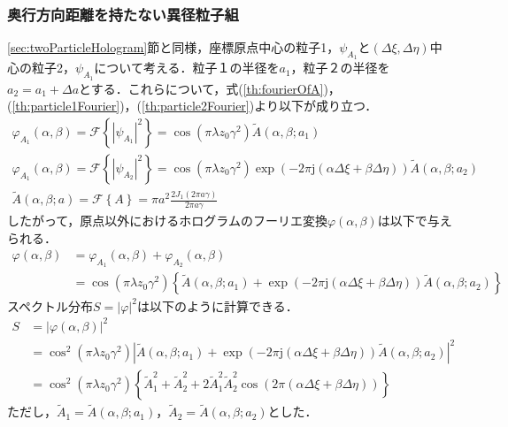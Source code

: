 \subsubsection{奥行方向距離を持たない異径粒子組}
\label{sec:appendix_deviation_radius}
\ref{sec:twoParticleHologram}節と同様，座標原点中心の粒子1，$\psi_{A_1}$と$(\Delta \xi, \Delta \eta)$中心の粒子2，$\psi_{A_1}$について考える．粒子１の半径を$a_1$，粒子２の半径を$a_2 = a_1 + \Delta a$とする．これらについて，式(\ref{th:fourierOfA})，(\ref{th:particle1Fourier})，(\ref{th:particle2Fourier})より以下が成り立つ．
\begin{gather}
    \varphi_{A_1} (\alpha,\beta) = \mathcal{F} \left\{ \left|\psi_{A_1}\right|^2 \right\} = \cos{\left( \pi \lambda z_0 \gamma^2 \right)} \tilde{A}(\alpha,\beta;a_1) \\
    \varphi_{A_1} (\alpha,\beta) = \mathcal{F} \left\{ \left|\psi_{A_2}\right|^2 \right\} = \cos{ \left( \pi \lambda z_0 \gamma^2 \right) } \exp{\left( -2\pi \mathrm{j}\left( \alpha \Delta \xi + \beta \Delta \eta \right) \right)} \tilde{A}(\alpha,\beta;a_2) \\
    \tilde{A}(\alpha,\beta;a) = \mathcal{F}\left\{ A \right\} = \pi a^2 \frac{2J_1(2\pi a \gamma)}{2\pi a \gamma}
\end{gather}
したがって，原点以外におけるホログラムのフーリエ変換$\varphi(\alpha,\beta)$は以下で与えられる．
\begin{align}
    \varphi(\alpha,\beta) &= \varphi_{A_1}(\alpha,\beta) + \varphi_{A_2}(\alpha,\beta) \\
    &= \cos{\left( \pi \lambda z_0 \gamma^2 \right)} \left\{ \tilde{A}(\alpha,\beta;a_1) + \exp{\left( -2\pi \mathrm{j}\left( \alpha \Delta \xi + \beta \Delta \eta \right) \right)} \tilde{A}(\alpha,\beta;a_2) \right\}
\end{align}
スペクトル分布$S = |\varphi|^2$は以下のように計算できる．
\begin{align}
    S &= \left| \varphi(\alpha,\beta) \right|^2 \\
    &= \cos^2{\left( \pi \lambda z_0 \gamma^2 \right)} \left| \tilde{A}(\alpha,\beta;a_1) + \exp{\left( -2\pi \mathrm{j}\left( \alpha \Delta \xi + \beta \Delta \eta \right) \right)} \tilde{A}(\alpha,\beta;a_2) \right|^2 \\
    &= \cos^2{\left( \pi \lambda z_0 \gamma^2 \right)} \left\{ \tilde{A}_1^2+\tilde{A}_2^2 + 2\tilde{A}_1^2\tilde{A}_2^2 \cos{\left( 2\pi \left( \alpha \Delta \xi + \beta \Delta \eta \right) \right)} \right\}
    \label{appendixEq:diffdiamspec}
\end{align}
ただし，$\tilde{A}_1 = \tilde{A}(\alpha,\beta;a_1)$，$\tilde{A}_2 = \tilde{A}(\alpha,\beta;a_2)$とした．

